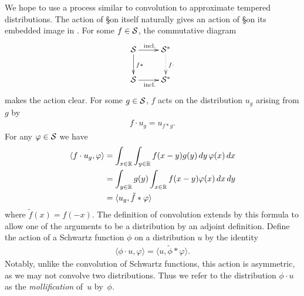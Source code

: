     We hope to use a process similar to convolution to approximate tempered distributions.
    The action of \S on itself naturally gives an action of \S on its embedded image in \SS.
    For some $f\in\S$, the commutative diagram  
    \begin{displaymath}
      \xymatrix{
        \S \ar[r]^{\text{incl.}} \ar[d]^{f*} & \SS \ar@{..>}[d]^{f\cdot}
        \\ \S \ar[r]_{\text{incl.}} & \SS
      }
    \end{displaymath}
    makes the action clear.
    For some $g\in\S$, $f$ acts on the distribution $u_g$ arising from $g$ by
    \begin{align*}
      f\cdot u_g = u_{f*g} \text{.}
    \end{align*}
    For any $\varphi\in\S$ we have
    \begin{align*}
      \langle f\cdot u_g, \varphi\rangle
      &= \int_{x\in\R} \int_{y\in\R} f(x-y)g(y)\,dy\,\varphi(x)\,dx
      \\&= \int_{y\in\R} g(y) \int_{x\in\R} f(x-y)\varphi(x)\,dx\,dy
      \\&= \langle u_g, \tilde f*\varphi\rangle
    \end{align*}
    where $\tilde f(x) = f(-x)$.
    The definition of convolution extends by this formula to allow one of the arguments to be a distribution by an adjoint definition.
    Define the action of a Schwartz function $\phi$ on a distribution $u$ by the identity
    \begin{align*}
      \langle \phi\cdot u, \varphi\rangle
      = \langle u, \tilde\phi*\varphi\rangle \text{.}
    \end{align*}
    Notably, unlike the convolution of Schwartz functions, this action is asymmetric, as we may not convolve two distributions.
    Thus we refer to the distribution $\phi\cdot u$ as the \emph{mollification} of~$u$ by~$\phi$.

